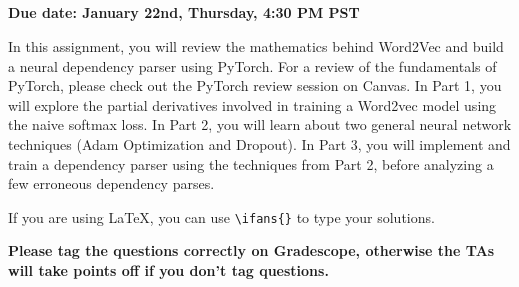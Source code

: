 \documentclass[answers]{exam}
\title{
\textmd{\textbf{\hmwkClass\ \hmwkTitle}}
}
\author{}
\date{}
\newif\ifanswers
\newcommand{\ifans}[1]{\ifanswers \color{red} \textbf{Solution: } #1 \color{black} \fi}
\begin{document}
\vspace{-1in}

\maketitle

\vspace{-0.5in}


\textbf{Due date: January 22nd, Thursday, 4:30 PM PST}


In this assignment, you will review the mathematics behind Word2Vec and build a neural dependency parser using PyTorch. For a review of the fundamentals of PyTorch, please check out the PyTorch review session on Canvas. In Part 1, you will explore the partial derivatives involved in training a Word2vec model using the naive softmax loss. In Part 2, you will learn about two general neural network techniques (Adam Optimization and Dropout). In Part 3, you will implement and train a dependency parser using the techniques from Part 2, before analyzing a few erroneous dependency parses.

If you are using LaTeX, you can use \verb!\ifans{}! to type your solutions.

\textbf{Please tag the questions correctly on Gradescope, otherwise the TAs will take points off if you don't tag questions.}


\begin{questions}
    
    \newpage
    
    \newpage
    
\end{questions}


\end{document}
